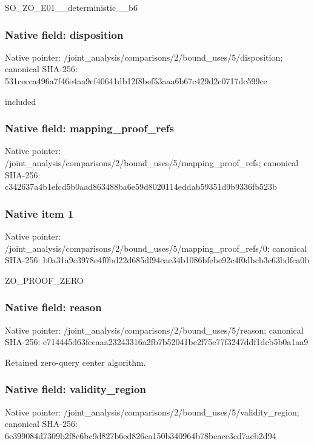 \documentclass[10pt,a4paper]{article}
\begin{document}
\begingroup\raggedright\sloppy SO\_\allowbreak{}ZO\_\allowbreak{}E01\_\allowbreak{}\_\allowbreak{}deterministic\_\allowbreak{}\_\allowbreak{}b6\par\endgroup

\subsubsection{Native field: disposition}
Native pointer: /joint\_\allowbreak{}analysis/comparisons/2/bound\_\allowbreak{}uses/5/disposition; canonical SHA-256: 531cecca496a7f46e4aa9ef40641db12f8bef53aaa6b67c429d2c0717dc599ce

\begingroup\raggedright\sloppy included\par\endgroup

\subsubsection{Native field: mapping\_\allowbreak{}proof\_\allowbreak{}refs}
Native pointer: /joint\_\allowbreak{}analysis/comparisons/2/bound\_\allowbreak{}uses/5/mapping\_\allowbreak{}proof\_\allowbreak{}refs; canonical SHA-256: c342637a4b1efcd5b0aad863488ba6e59d8020114eddab59351d9b9336fb523b

\subsubsection{Native item 1}
Native pointer: /joint\_\allowbreak{}analysis/comparisons/2/bound\_\allowbreak{}uses/5/mapping\_\allowbreak{}proof\_\allowbreak{}refs/0; canonical SHA-256: b0a31a9c3978e4f0bd22d685df94eae34b1086bfebe92c4f0dbcb3e63bdfca0b

\begingroup\raggedright\sloppy ZO\_\allowbreak{}PROOF\_\allowbreak{}ZERO\par\endgroup

\subsubsection{Native field: reason}
Native pointer: /joint\_\allowbreak{}analysis/comparisons/2/bound\_\allowbreak{}uses/5/reason; canonical SHA-256: e714445d63fccaaa23243316a2fb7b52041bc2f75e77f3247ddf1dcb5b0a1aa9

\begingroup\raggedright\sloppy Retained zero-query center algorithm.\par\endgroup

\subsubsection{Native field: validity\_\allowbreak{}region}
Native pointer: /joint\_\allowbreak{}analysis/comparisons/2/bound\_\allowbreak{}uses/5/validity\_\allowbreak{}region; canonical SHA-256: 6e399084d7309b2f8e6bc9d827b6ed826ea150b340964b78beacc3cd7aeb2d94
\end{document}
